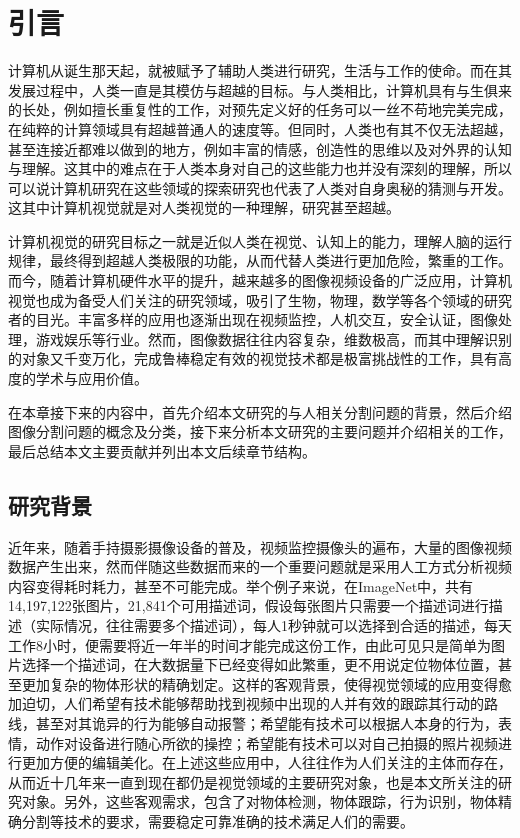 

\chapter{引言}
计算机从诞生那天起，就被赋予了辅助人类进行研究，生活与工作的使命。而在其发展过程中，人类一直是其模仿与超越的目标。与人类相比，计算机具有与生俱来的长处，例如擅长重复性的工作，对预先定义好的任务可以一丝不苟地完美完成，在纯粹的计算领域具有超越普通人的速度等。但同时，人类也有其不仅无法超越，甚至连接近都难以做到的地方，例如丰富的情感，创造性的思维以及对外界的认知与理解。这其中的难点在于人类本身对自己的这些能力也并没有深刻的理解，所以可以说计算机研究在这些领域的探索研究也代表了人类对自身奥秘的猜测与开发。这其中计算机视觉就是对人类视觉的一种理解，研究甚至超越。

计算机视觉的研究目标之一就是近似人类在视觉、认知上的能力，理解人脑的运行规律，最终得到超越人类极限的功能，从而代替人类进行更加危险，繁重的工作。而今，随着计算机硬件水平的提升，越来越多的图像视频设备的广泛应用，计算机视觉也成为备受人们关注的研究领域，吸引了生物，物理，数学等各个领域的研究者的目光。丰富多样的应用也逐渐出现在视频监控，人机交互，安全认证，图像处理，游戏娱乐等行业。然而，图像数据往往内容复杂，维数极高，而其中理解识别的对象又千变万化，完成鲁棒稳定有效的视觉技术都是极富挑战性的工作，具有高度的学术与应用价值。

在本章接下来的内容中，首先介绍本文研究的与人相关分割问题的背景，然后介绍图像分割问题的概念及分类，接下来分析本文研究的主要问题并介绍相关的工作，最后总结本文主要贡献并列出本文后续章节结构。
\section{研究背景}
近年来，随着手持摄影摄像设备的普及，视频监控摄像头的遍布，大量的图像视频数据产生出来，然而伴随这些数据而来的一个重要问题就是采用人工方式分析视频内容变得耗时耗力，甚至不可能完成。举个例子来说，在ImageNet\cite{imagenet}中，共有14,197,122张图片，21,841个可用描述词，假设每张图片只需要一个描述词进行描述（实际情况，往往需要多个描述词），每人1秒钟就可以选择到合适的描述，每天工作8小时，便需要将近一年半的时间才能完成这份工作，由此可见只是简单为图片选择一个描述词，在大数据量下已经变得如此繁重，更不用说定位物体位置，甚至更加复杂的物体形状的精确划定。这样的客观背景，使得视觉领域的应用变得愈加迫切，人们希望有技术能够帮助找到视频中出现的人并有效的跟踪其行动的路线，甚至对其诡异的行为能够自动报警；希望能有技术可以根据人本身的行为，表情，动作对设备进行随心所欲的操控；希望能有技术可以对自己拍摄的照片视频进行更加方便的编辑美化。在上述这些应用中，人往往作为人们关注的主体而存在，从而近十几年来一直到现在都仍是视觉领域的主要研究对象，也是本文所关注的研究对象。另外，这些客观需求，包含了对物体检测，物体跟踪，行为识别，物体精确分割等技术的要求，需要稳定可靠准确的技术满足人们的需要。

